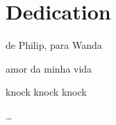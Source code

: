 \hypertarget{Dedication}{%
\chapter{Dedication}\label{Dedication}}

{de Philip, para Wanda}

{amor da minha vida}

{knock knock knock}

{\ldots{}}

